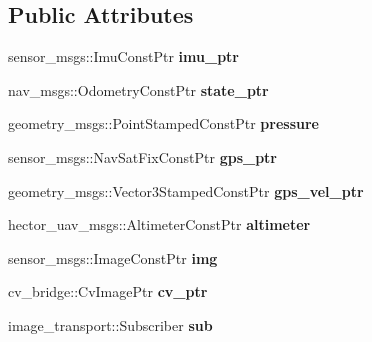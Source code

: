 \subsection*{\-Public \-Attributes}
\begin{DoxyCompactItemize}
\item 
\hypertarget{class_staterobot_af4cb7b1acaf2d9dc163661e031f148f2}{sensor\-\_\-msgs\-::\-Imu\-Const\-Ptr {\bfseries imu\-\_\-ptr}}\label{class_staterobot_af4cb7b1acaf2d9dc163661e031f148f2}

\item 
\hypertarget{class_staterobot_af147a2b2a09d1c5b101628eb61339b03}{nav\-\_\-msgs\-::\-Odometry\-Const\-Ptr {\bfseries state\-\_\-ptr}}\label{class_staterobot_af147a2b2a09d1c5b101628eb61339b03}

\item 
\hypertarget{class_staterobot_a8ab2546d67712dbed7d288f66430d923}{geometry\-\_\-msgs\-::\-Point\-Stamped\-Const\-Ptr {\bfseries pressure}}\label{class_staterobot_a8ab2546d67712dbed7d288f66430d923}

\item 
\hypertarget{class_staterobot_a032ce0d173993f78b179d3964aad98ee}{sensor\-\_\-msgs\-::\-Nav\-Sat\-Fix\-Const\-Ptr {\bfseries gps\-\_\-ptr}}\label{class_staterobot_a032ce0d173993f78b179d3964aad98ee}

\item 
\hypertarget{class_staterobot_aff1f5ea1732d5fc0298f7bd114715ebe}{geometry\-\_\-msgs\-::\-Vector3\-Stamped\-Const\-Ptr {\bfseries gps\-\_\-vel\-\_\-ptr}}\label{class_staterobot_aff1f5ea1732d5fc0298f7bd114715ebe}

\item 
\hypertarget{class_staterobot_a08857351f3bb69c9590778240fcf2d78}{hector\-\_\-uav\-\_\-msgs\-::\-Altimeter\-Const\-Ptr {\bfseries altimeter}}\label{class_staterobot_a08857351f3bb69c9590778240fcf2d78}

\item 
\hypertarget{class_staterobot_abf4b6be91bd0f6be3a78ca438dc38ac2}{sensor\-\_\-msgs\-::\-Image\-Const\-Ptr {\bfseries img}}\label{class_staterobot_abf4b6be91bd0f6be3a78ca438dc38ac2}

\item 
\hypertarget{class_staterobot_aed9668b08e6c38c4008daa836fa88269}{cv\-\_\-bridge\-::\-Cv\-Image\-Ptr {\bfseries cv\-\_\-ptr}}\label{class_staterobot_aed9668b08e6c38c4008daa836fa88269}

\item 
\hypertarget{class_staterobot_a56690a2dc306e9147b373ac8f7145ffa}{image\-\_\-transport\-::\-Subscriber {\bfseries sub}}\label{class_staterobot_a56690a2dc306e9147b373ac8f7145ffa}


\end{DoxyCompactItemize}
